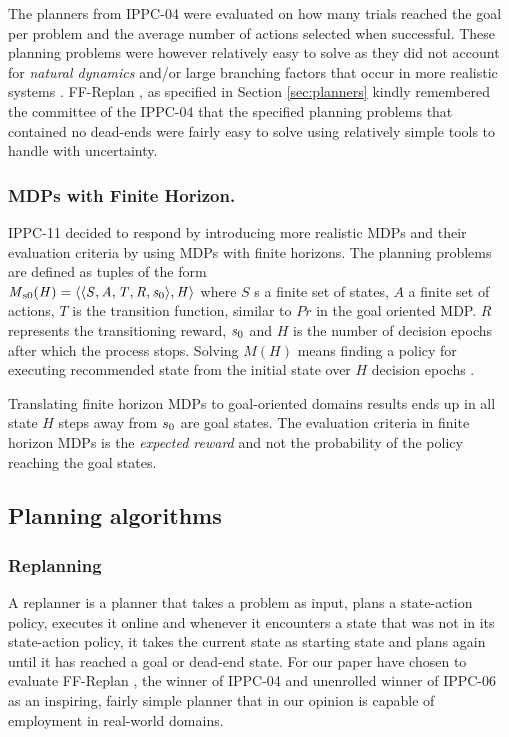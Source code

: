 \documentclass[runningheads,a4paper]{llncs}
\begin{document}
 The planners from IPPC-04 were evaluated on how many trials reached the goal per problem and the average number of actions selected when successful. These planning problems were however relatively easy to solve as they did not account for \emph{natural dynamics} and/or large branching factors that occur in more realistic systems \cite{kolobov2012glutton}. FF-Replan \cite{FFReplan}, as specified in Section \ref{sec:planners} kindly remembered the committee of the IPPC-04 that the specified planning problems that contained no dead-ends were fairly easy to solve using relatively simple tools to handle with uncertainty.

\subsubsection{MDPs with Finite Horizon. }IPPC-11 decided to respond by introducing more realistic MDPs and their evaluation criteria by using MDPs with finite horizons. The planning problems are defined as tuples of the form \\ $\mathit{M\textsubscript{s0}(H) = \langle \langle S, A, T, R, s\textsubscript{0} \rangle , H \rangle }$ where $\mathit{S}$ s a finite set of states, $\mathit{A}$ a finite set of actions, $\mathit{T}$ is the transition function, similar to $\mathit{Pr}$ in the goal oriented MDP. $\mathit{R}$ represents the transitioning reward, $\mathit{s\textsubscript{0}}$ and $\mathit{H}$ is the number of decision epochs after which the process stops. Solving $\mathit{M(H)}$ means finding a policy for executing recommended state from the initial state over $\mathit{H}$ decision epochs \cite{kolobov2012gourmand}.

Translating finite horizon MDPs to goal-oriented domains results ends up in all state $H$ steps away from $s\textsubscript{0}$ are goal states. The evaluation criteria in finite horizon MDPs is the \emph{expected reward} and not the probability of the policy reaching the goal states.

\subsection{Planning algorithms}
\subsubsection{Replanning}
A replanner is a planner that takes a problem as input, plans a state-action policy, executes it online and whenever it encounters a state that was not in its state-action policy, it takes the current state as starting state and plans again until it has reached a goal or dead-end state. For our paper have chosen to evaluate FF-Replan \cite{FFReplan}, the winner of IPPC-04 and unenrolled winner of IPPC-06 as an inspiring, fairly simple planner that in our opinion is capable of employment in real-world domains.
\end{document}
